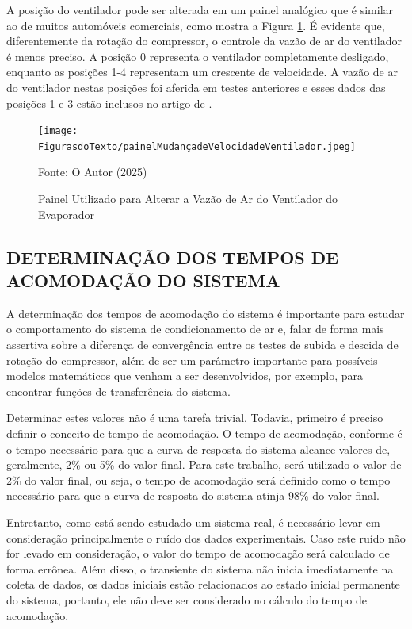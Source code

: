 A posição do ventilador pode ser alterada em um painel analógico que é similar ao de muitos automóveis comerciais, como mostra a Figura \ref{fig:painelMudançadeVelocidadeVentilador}. É evidente que, diferentemente da rotação do compressor, o controle da vazão de ar do ventilador é menos preciso. A posição 0 representa o ventilador completamente desligado, enquanto as posições 1-4 representam um crescente de velocidade. A vazão de ar do ventilador nestas posições foi aferida em testes anteriores e esses dados das posições 1 e 3 estão inclusos no artigo de \textcite{ExperimentalThermalPerformance}.
\newpage
\begin{figure}[h]
    \centering
    \texttt{[image: FigurasdoTexto/painelMudançadeVelocidadeVentilador.jpeg]}
    \caption{Painel Utilizado para Alterar a Vazão de Ar do Ventilador do Evaporador}
    \label{fig:painelMudançadeVelocidadeVentilador}

    {\footnotesize Fonte: O Autor (2025)}

\end{figure}

\subsection{\MakeUppercase{Determinação dos Tempos de Acomodação do Sistema}} \label{subsec:Tempo de Acomodação do Sistema}

A determinação dos tempos de acomodação do sistema é importante para estudar o comportamento do sistema de condicionamento de ar e, falar
 de forma mais assertiva sobre a diferença de convergência entre os testes de subida e descida de rotação do compressor, além de ser um parâmetro importante para possíveis modelos matemáticos que venham a ser desenvolvidos, por exemplo, para encontrar funções de transferência do sistema. 

Determinar estes valores não é uma tarefa trivial. Todavia, primeiro é preciso definir o conceito de tempo de acomodação. O tempo de acomodação, conforme \textcite{ogataControle} é o tempo necessário para que a curva de resposta do sistema alcance valores de, geralmente, 2\% ou 5\% do valor final. Para este trabalho, será utilizado o valor de 2\% do valor final, ou seja, o tempo de acomodação será definido como o tempo necessário para que a curva de resposta do sistema atinja 98\% do valor final.

Entretanto, como está sendo estudado um sistema real, é necessário levar em consideração principalmente o ruído dos dados experimentais. Caso este ruído não for levado em consideração, o valor do tempo de acomodação será calculado de forma errônea. Além disso, o transiente do sistema não inicia imediatamente na coleta de dados, os dados iniciais estão relacionados ao estado inicial permanente do sistema, portanto, ele não deve ser considerado no cálculo do tempo de acomodação. 

